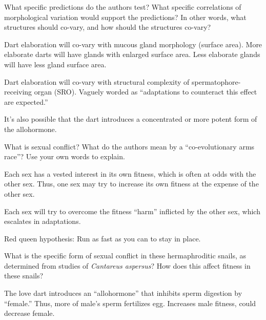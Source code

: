 \documentclass[11pt, addpoints]{exam}
\begin{document}
\begin{questions}

\question[5]
 What specific predictions do the authors test? What specific
  correlations of morphological variation would support the predictions?
  In other words, what structures should co-vary, and how should the
  structures co-vary?

\ifprintanswers\begin{solution}
Dart elaboration will co-vary with mucous gland morphology (surface area).  More elaborate darts will have glands with enlarged surface area.  Less elaborate glands will have less gland surface area.

Dart elaboration will co-vary with structural complexity of spermatophore-receiving organ (SRO). Vaguely worded as ``adaptations to counteract this effect are expected.''

It's also possible that the dart introduces a concentrated or more potent form of the allohormone.
\end{solution}
\else{}
\fi

\question[5]
What is sexual conflict? What do the authors mean by a
  ``co-evolutionary arms race''? Use your own words to explain.
  
\ifprintanswers\begin{solution}
Each sex has a vested interest in its own fitness, which is often at odds with the other sex.  Thus, one sex may try to increase its own fitness at the expense of the other sex.

Each sex will try to overcome the fitness ``harm'' inflicted by the other sex, which escalates in adaptations.

Red queen hypothesis: Run as fast as you can to stay in place.
\end{solution}
\else{}
\fi

\question[5]
\label{q:3}What is the specific form of sexual conflict in these hermaphroditic
  snails, as determined from studies of \emph{Cantareus aspersus}? How
  does this affect fitness in these snails?

\ifprintanswers\begin{solution}
The love dart introduces an “allohormone” that inhibits sperm digestion by “female.”  Thus, more of male’s sperm fertilizes egg.  Increases male fitness, could decrease female.
\end{solution}
\else{}
\fi


\end{questions}
\end{document}
